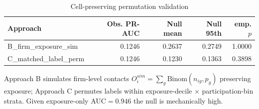 \begin{table}[htbp]\centering
\caption{Cell-preserving permutation validation}
\label{tab:opp_permutation}
\begin{tabular}{lrrrr}\hline
Approach & Obs. PR-AUC & Null mean & Null 95th & emp. $p$ \\\hline
B\_firm\_exposure\_sim & 0.1246 & 0.2637 & 0.2749 & 1.0000 \\
C\_matched\_label\_perm & 0.1246 & 0.1230 & 0.1363 & 0.3898 \\
\hline\end{tabular}
\begin{tablenotes}\footnotesize\item Approach B simulates firm-level contacts $O_i^{sim}=\sum_g \text{Binom}(n_{ig},p_g)$ preserving exposure; Approach C permutes labels within exposure-decile $\times$ participation-bin strata. Given exposure-only AUC$=0.946$ the null is mechanically high.\end{tablenotes}
\end{table}
